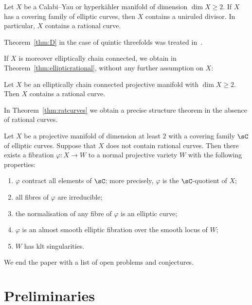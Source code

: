 \begin{theo}\label{thm:D}
Let $X$ be a Calabi--Yau or hyperkähler manifold of dimension $\dim X \geq 2$. If $X$ has a covering family of elliptic curves, then $X$ contains a uniruled divisor. In particular, $X$ contains a rational curve.
\end{theo}

Theorem~\ref{thm:D} in the case of quintic threefolds was treated in~\cite[Lecture 22]{CKL88}.

If $X$ is moreover elliptically chain connected, we obtain in Theorem~\ref{thm:ellipticrational}, without any further assumption on $X$:

\begin{theo}\label{thm:main1.5}
Let $X$ be an elliptically chain connected projective manifold with $\dim X \geq 2$. Then $X$ contains a rational curve.
\end{theo}

In Theorem~\ref{thm:ratcurves} we obtain a precise structure theorem in the absence of rational curves.

\pagebreak
\begin{theo}\label{thm:main1.6}
Let $X$ be a projective manifold of dimension at least $2$ with a covering family $\sC$ of elliptic curves. Suppose that $X$ does not contain rational curves. Then there exists a fibration $\varphi\colon X \to W$ to a normal projective variety $W$ with the following properties:
\begin{enumerate}\romanenumi
\item \label{list-1.6.1}$\varphi$ contract all elements of $\sC$; more precisely, $\varphi$ is the $\sC$-quotient of $X$;
\item \label{list-1.6.2}all fibres of $\varphi$ are irreducible;
\item \label{list-1.6.3}the normalisation of any fibre of $\varphi$ is an elliptic curve;
\item \label{list-1.6.4}$\varphi$ is an almost smooth elliptic fibration over the smooth locus of $W$;
\item \label{list-1.6.5}$W$ has klt singularities.
\end{enumerate}
\end{theo}

We end the paper with a list of open problems and conjectures.


\section{Preliminaries} \label{sec:prelim}

